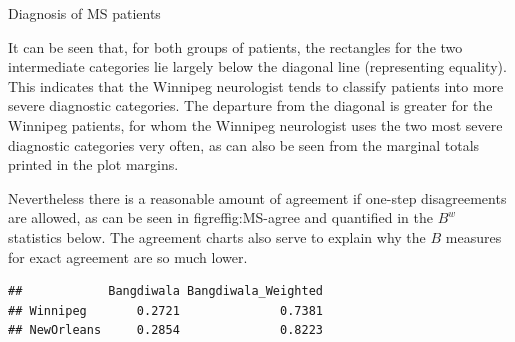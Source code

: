 \documentclass[11pt]{book}
\renewenvironment{knitrout}{\small\renewcommand{\baselinestretch}{.85}}{} %
\begin{document}
\begin{Example}[MS2]{Diagnosis of MS patients}
\begin{knitrout}
\end{knitrout}

It can be seen that, for
both groups of patients, the rectangles for the 
two intermediate categories lie largely below the diagonal line
(representing equality).  This 
indicates that the Winnipeg neurologist tends to classify patients
into more severe diagnostic categories.
The departure from the diagonal is greater for the Winnipeg patients,
for whom the Winnipeg neurologist uses the two most severe diagnostic
categories very often, as can also be seen from the marginal totals
printed in the plot margins.

Nevertheless there is a reasonable amount of agreement if one-step
disagreements are allowed, as can be seen in figref{fig:MS-agree}
and quantified in the $B^w$ statistics below.
The agreement charts also serve to explain why the $B$ measures for
exact agreement are so much lower.
\begin{knitrout}
\color{fgcolor}\begin{kframe}
\begin{alltt}
 \hlkwb{<-} \hlstd{(MSPatients[,,}\hlstd{])}
 \hlkwb{<-} \hlstd{(MSPatients[,,}\hlstd{])}
\hlstd{(}\hlstd{=} \hlstd{=}\hlstd{(agr2))[,}\hlopt{:}\hlstd{]}
\end{alltt}
\begin{verbatim}
##            Bangdiwala Bangdiwala_Weighted
## Winnipeg       0.2721              0.7381
## NewOrleans     0.2854              0.8223
\end{verbatim}
\end{kframe}
\end{knitrout}




\end{Example}
\end{document}
